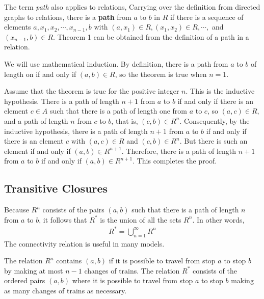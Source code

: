 \documentclass{report}
\begin{document}
The term \textit{path} also applies to relations, Carrying over the definition from directed graphs to 
relations, there is a \textbf{path} from $a$ to $b$ in $R$ if there is a sequence of elements 
$a, x_1, x_2,\cdots, x_{n-1}, b$ with $(a,x_1)\in R, (x_1,x_2)\in R,\cdots,$ and $(x_{n-1}, b)\in R$. 
Theorem 1 can be obtained from the definition of a path in a relation.

\begin{myproof}
    We will use mathematical induction. By definition, there is a path from $a$ to $b$ of length on if 
    and only if $(a,b)\in R$, so the theorem is true when $n=1$.
    \par
    Assume that the theorem is true for the positive integer $n$. This is the inductive hypothesis. There
    is a path of length $n+1$ from $a$ to $b$ if and only if there is an element $c\in A$ such that 
    there is a path of length one from $a$ to $c$, so $(a,c)\in R$, and a path of length $n$ from $c$ to $b$, 
    that is, $(c,b)\in R^n$. Consequently, by the inductive hypothesis, there is a path of length $n+1$ from
    $a$ to $b$ if and only if there is an element $c$ with $(a,c)\in R$ and $(c,b)\in R^n$. But there is such an
    element if and only if $(a,b)\in R^{n+1}$. Therefore, there is a path of length $n+1$ from $a$ to $b$ if
    and only if $(a,b)\in R^{n+1}$. This completes the proof.
\end{myproof}

\subsection{Transitive Closures}

Because $R^n$ consists of the pairs $(a,b)$ such that there is a path of length $n$ from $a$ to $b$, it
follows that $R^*$ is the union of all the sets $R^n$. In other words,
\begin{align*}
    R^*=\bigcup^\infty_{n=1} R^n
\end{align*}
The connectivity relation is useful in many models.

\sol
The relation $R^n$ contains $(a,b)$ if it is possible to travel from stop $a$ to stop $b$ by 
making at most $n-1$ changes of trains. The relation $R^*$ consists of the ordered pairs $(a,b)$ 
where it is possible to travel from stop $a$ to stop $b$ making as many changes of trains as necessary.
\end{document}
